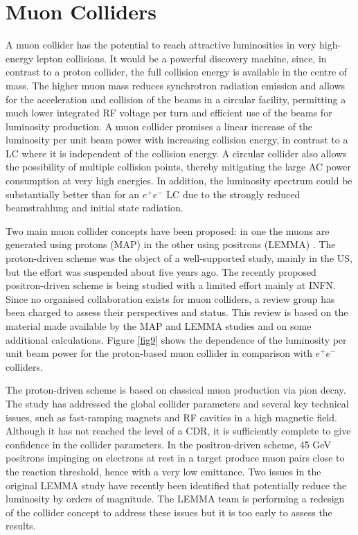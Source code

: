 \section{Muon Colliders}
\label{sec:muon}
A muon collider \cite{muonid} has the potential to reach attractive luminosities in very high-energy lepton collisions. It would be a powerful discovery machine, since, in contrast to a proton collider, the full collision energy is available in the centre of mass. The higher muon mass reduces synchrotron radiation emission and allows for the acceleration and collision of the beams in a circular facility, permitting a much lower integrated RF voltage per turn and efficient use of the beams for luminosity production. A muon collider promises a linear increase of the luminosity per unit beam power with increasing collision energy, in contrast to a LC where it is independent of the collision energy. A circular collider also allows the possibility of multiple collision points, thereby mitigating the large AC power consumption at very high energies. In addition, the luminosity spectrum could be substantially better than for an $e^+e^-$ LC due to the strongly reduced beamstrahlung and initial state radiation. 

Two main muon collider concepts have been proposed: in one the muons are generated using protons (MAP) \cite{Delahaye:2013jla,accel:muon3-sr1} 
in the other using positrons (LEMMA) \cite{Antonelli:2015nla}\cite{accel:lemma2019}. The proton-driven scheme was the object of a well-supported study, mainly in the US, but the effort was suspended about five years ago. The recently proposed positron-driven scheme is being studied with a limited effort mainly at INFN. Since no organised collaboration exists for muon colliders, a review group has been charged to assess their perspectives and status. This review is based on the material made available by the MAP and LEMMA studies and on some additional calculations. 
Figure \ref{fig9} shows the dependence of the luminosity per unit beam power for the proton-based muon collider in comparison with $e^+e^-$ colliders. 

The proton-driven scheme is based on classical muon production via pion decay. The study has addressed the global collider parameters and several key technical issues, such as fast-ramping magnets and RF cavities in a high magnetic field. Although it has not reached the level of a CDR, it is sufficiently complete to give confidence in the collider parameters. In the positron-driven scheme, 45 GeV positrons impinging on electrons at rest in a target produce muon pairs close to the reaction threshold, hence with a very low emittance. Two issues in the original LEMMA study have recently been identified that potentially reduce the luminosity by orders of magnitude. The LEMMA team is performing a redesign of the collider concept to address these issues but it is too early to assess the results.

